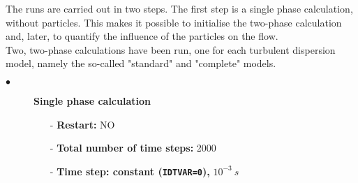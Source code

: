 \documentclass[a4paper,twoside,12pt]{article}
\begin{document}
The runs are carried out in two steps. The first step is a single phase calculation, without particles. This makes it possible to initialise the two-phase calculation and, later, to quantify the influence of the particles on the flow.\\ Two, two-phase calculations have been run, one for each turbulent dispersion model, namely the so-called "standard" and "complete" models.

\begin{description}

   \item[$\bullet$]\textbf{Single phase calculation}
         \begin{itemize}
            \item[-] {\bf Restart:} NO
            \item[-] {\bf Total number of time steps:} 2000
            \item[-] {\bf Time step: constant (\texttt{IDTVAR=0}), } $10^{-3}~s$
         \end{itemize}



\end{description}
\end{document}

